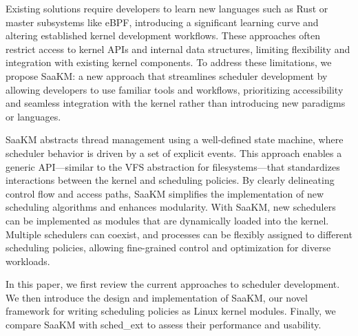 Existing solutions require developers to learn new languages such as Rust or master subsystems like eBPF, introducing a significant learning curve and altering established kernel development workflows. These approaches often restrict access to kernel APIs and internal data structures, limiting flexibility and integration with existing kernel components. To address these limitations, we propose SaaKM: a new approach that streamlines scheduler development by allowing developers to use familiar tools and workflows, prioritizing accessibility and seamless integration with the kernel rather than introducing new paradigms or languages. 

SaaKM abstracts thread management using a well-defined state machine, where scheduler behavior is driven by a set of explicit events. This approach enables a generic API—similar to the VFS abstraction for filesystems—that standardizes interactions between the kernel and scheduling policies. By clearly delineating control flow and access paths, SaaKM simplifies the implementation of new scheduling algorithms and enhances modularity. With SaaKM, new schedulers can be implemented as modules that are dynamically loaded into the kernel. Multiple schedulers can coexist, and processes can be flexibly assigned to different scheduling policies, allowing fine-grained control and optimization for diverse workloads.

In this paper, we first review the current approaches to scheduler development. We then introduce the design and implementation of SaaKM, our novel framework for writing scheduling policies as Linux kernel modules. Finally, we compare SaaKM with sched\_ext to assess their performance and usability.



